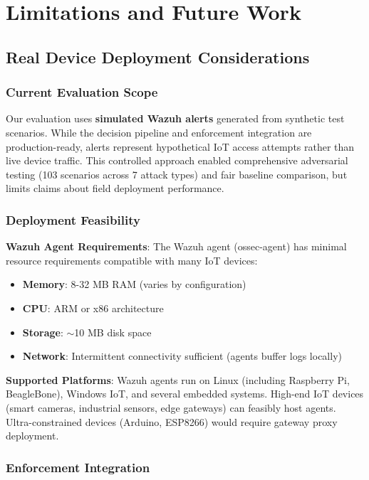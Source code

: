 \documentclass[conference]{IEEEtran}
\begin{document}
\section{Limitations and Future Work}

\subsection{Real Device Deployment Considerations}

\subsubsection{Current Evaluation Scope}

Our evaluation uses \textbf{simulated Wazuh alerts} generated from synthetic test scenarios. While the decision pipeline and enforcement integration are production-ready, alerts represent hypothetical IoT access attempts rather than live device traffic. This controlled approach enabled comprehensive adversarial testing (103 scenarios across 7 attack types) and fair baseline comparison, but limits claims about field deployment performance.

\subsubsection{Deployment Feasibility}

\textbf{Wazuh Agent Requirements}: The Wazuh agent (ossec-agent) has minimal resource requirements compatible with many IoT devices:
\begin{itemize}
    \item \textbf{Memory}: 8-32 MB RAM (varies by configuration)
    \item \textbf{CPU}: ARM or x86 architecture
    \item \textbf{Storage}: $\sim$10 MB disk space
    \item \textbf{Network}: Intermittent connectivity sufficient (agents buffer logs locally)
\end{itemize}

\textbf{Supported Platforms}: Wazuh agents run on Linux (including Raspberry Pi, BeagleBone), Windows IoT, and several embedded systems. High-end IoT devices (smart cameras, industrial sensors, edge gateways) can feasibly host agents. Ultra-constrained devices (Arduino, ESP8266) would require gateway proxy deployment.

\subsubsection{Enforcement Integration}
\end{document}
